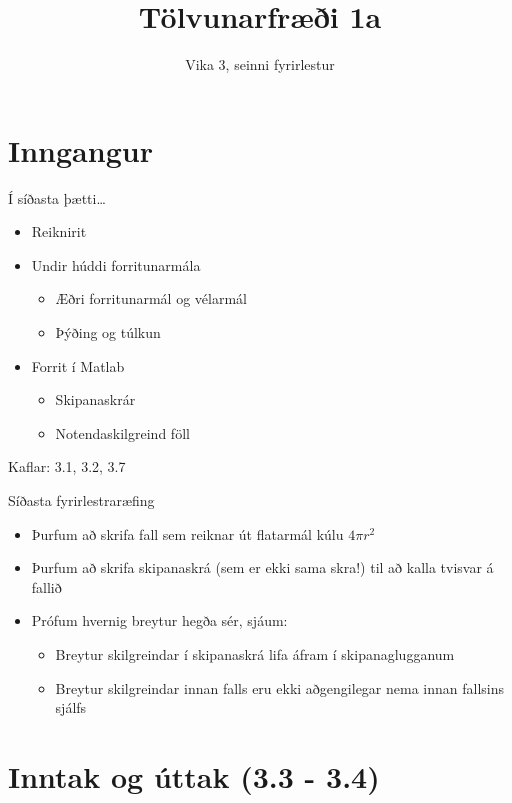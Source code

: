 \documentclass[handout]{beamer}
\title{Tölvunarfræði 1a}
\subtitle{Vika 3, seinni fyrirlestur}
\begin{document}
\begin{frame}
\titlepage
\end{frame}

\section{Inngangur}

\begin{frame}{Í síðasta þætti\ldots}
\begin{itemize}
 \item Reiknirit
 \item Undir húddi forritunarmála
 \begin{itemize}
  \item Æðri forritunarmál og vélarmál
  \item Þýðing og túlkun
 \end{itemize}
 \item Forrit í Matlab
 \begin{itemize}
  \item Skipanaskrár
  \item Notendaskilgreind föll
 \end{itemize}
\end{itemize}
Kaflar: 3.1, 3.2, 3.7
\end{frame}

\begin{frame}{Síðasta fyrirlestraræfing}
    \begin{itemize}
        \item Þurfum að skrifa fall sem reiknar út flatarmál kúlu $4\pi r^2$
        \item Þurfum að skrifa skipanaskrá (sem er ekki sama skra!) til að kalla tvisvar á fallið
        \item Prófum hvernig breytur hegða sér, sjáum:
        \begin{itemize}
            \item Breytur skilgreindar í skipanaskrá lifa áfram í skipanaglugganum
            \item Breytur skilgreindar innan falls eru ekki aðgengilegar nema innan fallsins sjálfs
        \end{itemize}
    \end{itemize}
\end{frame}

\section{Inntak og úttak (3.3 - 3.4)}
\end{document}
